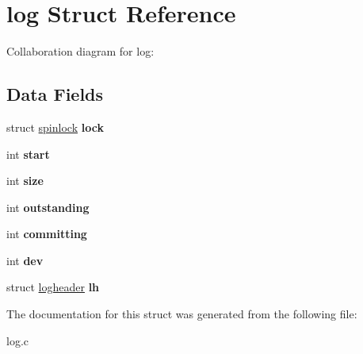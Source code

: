 \hypertarget{structlog}{}\section{log Struct Reference}
\label{structlog}


Collaboration diagram for log\+:
\subsection*{Data Fields}
\begin{DoxyCompactItemize}
\item 
\mbox{\label{structlog_a980a1d1aa9c60af7a82f297f8ab54d2e}} 
struct \mbox{\hyperlink{structspinlock}{spinlock}} {\bfseries lock}
\item 
\mbox{\label{structlog_a28d847dd722497fa3497b14f68267618}} 
int {\bfseries start}
\item 
\mbox{\label{structlog_a2257e716d4b77efd0524286cf5772a41}} 
int {\bfseries size}
\item 
\mbox{\label{structlog_addfc1fc09a124978bd7e2a23a19d733d}} 
int {\bfseries outstanding}
\item 
\mbox{\label{structlog_afc034b98b98897c179ca8fae8e2ee181}} 
int {\bfseries committing}
\item 
\mbox{\label{structlog_aebeeb9df7326549fb5d8b7221c9b0aa3}} 
int {\bfseries dev}
\item 
\mbox{\label{structlog_a7808516ed2f708dcb13912b1e8fc20d9}} 
struct \mbox{\hyperlink{structlogheader}{logheader}} {\bfseries lh}
\end{DoxyCompactItemize}


The documentation for this struct was generated from the following file\+:\begin{DoxyCompactItemize}
\item 
log.\+c\end{DoxyCompactItemize}
